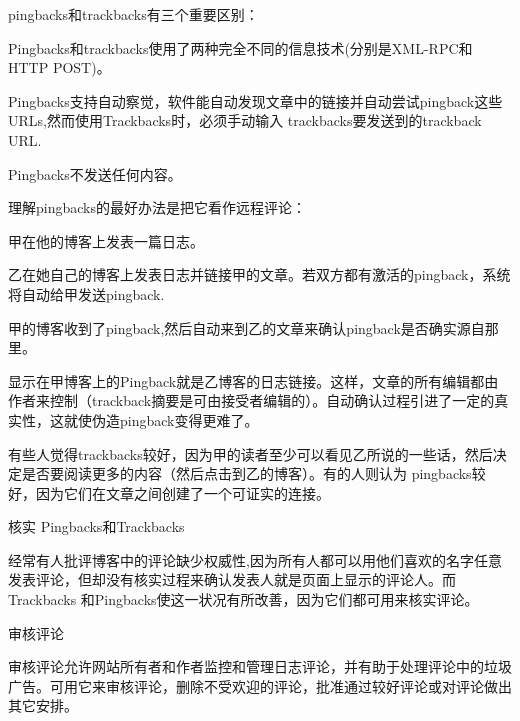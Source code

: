 \begin{compactenum}

pingbacks和trackbacks有三个重要区别：

\begin{compactitem}
\item Pingbacks和trackbacks使用了两种完全不同的信息技术(分别是XML-RPC和HTTP POST)。
\item Pingbacks支持自动察觉，软件能自动发现文章中的链接并自动尝试pingback这些URLs,然而使用Trackbacks时，必须手动输入 trackbacks要发送到的trackback URL.
\item Pingbacks不发送任何内容。
\end{compactitem}

理解pingbacks的最好办法是把它看作远程评论：

\begin{compactitem}
\item 甲在他的博客上发表一篇日志。
\item 乙在她自己的博客上发表日志并链接甲的文章。若双方都有激活的pingback，系统将自动给甲发送pingback.
\item 甲的博客收到了pingback,然后自动来到乙的文章来确认pingback是否确实源自那里。
\end{compactitem}

显示在甲博客上的Pingback就是乙博客的日志链接。这样，文章的所有编辑都由作者来控制（trackback摘要是可由接受者编辑的）。自动确认过程引进了一定的真实性，这就使伪造pingback变得更难了。

有些人觉得trackbacks较好，因为甲的读者至少可以看见乙所说的一些话，然后决定是否要阅读更多的内容（然后点击到乙的博客）。有的人则认为 pingbacks较好，因为它们在文章之间创建了一个可证实的连接。

\item 核实 Pingbacks和Trackbacks

经常有人批评博客中的评论缺少权威性,因为所有人都可以用他们喜欢的名字任意发表评论，但却没有核实过程来确认发表人就是页面上显示的评论人。而Trackbacks 和Pingbacks使这一状况有所改善，因为它们都可用来核实评论。

\item 审核评论

审核评论允许网站所有者和作者监控和管理日志评论，并有助于处理评论中的垃圾广告。可用它来审核评论，删除不受欢迎的评论，批准通过较好评论或对评论做出其它安排。


\end{compactenum}

